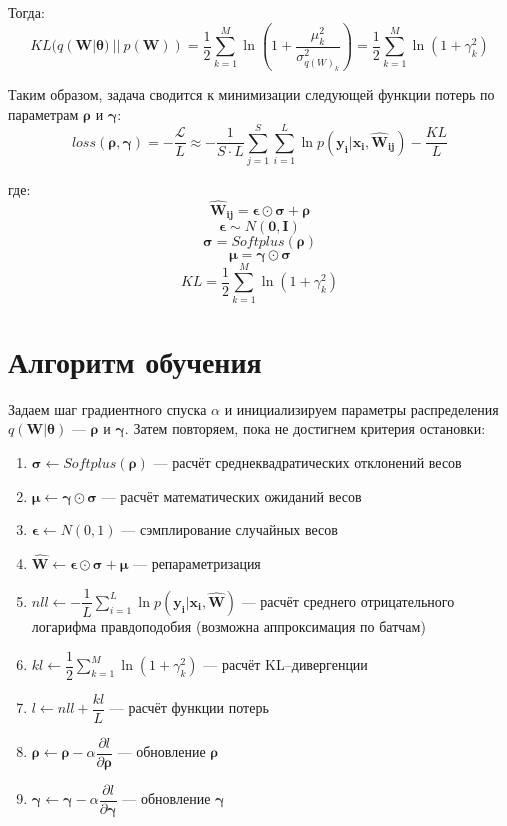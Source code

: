 \documentclass{article}
\begin{document}
Тогда:
\[
KL(q(\pmb{W} | \pmb{\theta})~||~p(\pmb{W})) =
\dfrac{1}{2}\sum_{k=1}^{M}\ln({1 + \dfrac{\mu_{k}^2}{\sigma_{{q(W)_{k}}}^2}}) =
\dfrac{1}{2}\sum_{k=1}^{M}\ln({1 + \gamma_{k}^{2}})
\]

Таким образом, задача сводится к минимизации следующей функции потерь по параметрам $\pmb{\rho}$ и $\pmb{\gamma}$:
\[
loss(\pmb{\rho}, \pmb{\gamma}) =
- \dfrac{\mathcal{L}}{L} \approx
 -\dfrac{1}{S \cdot L} \sum_{j=1}^S \sum_{i=1}^{L}  {\ln{p(\pmb{y_{i}} | \pmb{x_{i}}, \pmb{\hat{W}_{ij}})}} - \dfrac{KL}{L}
\]

где:
\[
 \pmb{\hat{W}_{ij}} = \pmb{\epsilon} \odot \pmb{\sigma} + \pmb{\rho}
\]
\[
 \pmb{\epsilon} \sim N(\pmb{0}, \pmb{I})
\]
\[
 \pmb{\sigma} = Softplus(\pmb{\rho})
\]
\[
 \pmb{\mu} = \pmb{\gamma} \odot \pmb{\sigma}
\]
\[
 KL = \dfrac{1}{2}\sum_{k=1}^{M}\ln({1 + \gamma_{k}^{2}})
\]

\section{Алгоритм обучения}

Задаем шаг градиентного спуска $\alpha$ и инициализируем параметры распределения $q(\pmb{W} | \pmb{\theta})$ — $\pmb{\rho}$ и $\pmb{\gamma}$. Затем повторяем, пока не достигнем критерия остановки:
\begin{enumerate}
    \item $\pmb{\sigma} \leftarrow Softplus(\pmb{\rho})$ --- расчёт среднеквадратических отклонений весов
    \item $\pmb{\mu} \leftarrow \pmb{\gamma} \odot \pmb{\sigma}$ --- расчёт математических ожиданий весов
    \item $\pmb{\epsilon} \leftarrow N(0, 1)$ --- сэмплирование случайных весов
    \item $\hat{\pmb{W}} \leftarrow \pmb{\epsilon} \odot \pmb{\sigma} + \pmb{\mu}$ --- репараметризация
    \item $nll \leftarrow -\dfrac{1}{L}\sum_{i=1}^{L}{\ln{p( \pmb{y_{i}} | \pmb{x_{i}}, \pmb{\hat{W}})}}$ --- расчёт среднего отрицательного логарифма правдоподобия (возможна аппроксимация по батчам)
    \item $kl \leftarrow \dfrac{1}{2}\sum_{k=1}^{M}\ln({1 + \gamma_{k}^{2}})$ --- расчёт KL--дивергенции
    \item $l \leftarrow nll + \dfrac{kl}{L}$ --- расчёт функции потерь
    \item $\pmb{\rho} \leftarrow \pmb{\rho} - \alpha \dfrac{\partial l}{\partial \pmb{\rho}}$ --- обновление $\pmb{\rho}$
    \item $\pmb{\gamma} \leftarrow \pmb{\gamma} - \alpha \dfrac{\partial l}{\partial \pmb{\gamma}}$ --- обновление $\pmb{\gamma}$
\end{enumerate}
\end{document}
